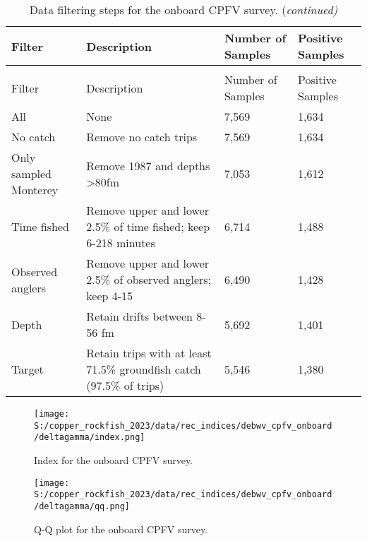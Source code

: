 \documentclass[11pt,
  letterpaper,
]{article}
\begin{document}
\begin{landscape}\begingroup\fontsize{9}{11}\selectfont

\begin{longtable}[t]{l>{\raggedright\arraybackslash}p{8cm}ll}
\caption{\label{tab:deb-filter}Data filtering steps for the onboard CPFV survey.}\\
\toprule
Filter & Description & Number of Samples & Positive Samples\\
\midrule
\endfirsthead
\caption[]{Data filtering steps for the onboard CPFV survey. (\textit{continued)}}\\
\toprule
Filter & Description & Number of Samples & Positive Samples\\
\midrule
\endhead

\endfoot
\bottomrule
\endlastfoot
All & None & 7,569 & 1,634\\
No catch & Remove no catch trips & 7,569 & 1,634\\
Only sampled Monterey & Remove 1987 and depths >80fm & 7,053 & 1,612\\
Time fished & Remove upper and lower 2.5\% of time fished; keep 6-218 minutes & 6,714 & 1,488\\
Observed anglers & Remove upper and lower 2.5\% of observed anglers; keep 4-15 & 6,490 & 1,428\\
Depth & Retain drifts between 8-56 fm & 5,692 & 1,401\\
Target & Retain trips with at least 71.5\% groundfish catch (97.5\% of trips) & 5,546 & 1,380\\*
\end{longtable}
\endgroup{}
\end{landscape}
\endgroup{}

\newpage

\begin{figure}
{\centering
\texttt{[image: S:/copper\_rockfish\_2023/data/rec\_indices/debwv\_cpfv\_onboard/deltagamma/index.png]}
}
\caption{Index for the onboard CPFV survey.\label{fig:deb-index}}
\end{figure}

\newpage

\begin{figure}
{\centering
\texttt{[image: S:/copper\_rockfish\_2023/data/rec\_indices/debwv\_cpfv\_onboard/deltagamma/qq.png]}
}
\caption{Q-Q plot for the onboard CPFV survey.\label{fig:deb-qq}}
\end{figure}
\end{document}

